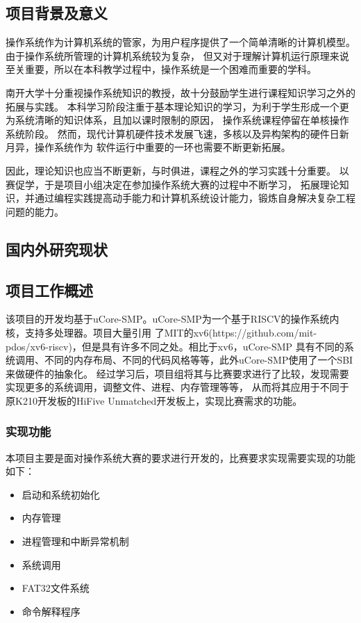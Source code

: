 \documentclass[UTF8,a4paper,10pt]{ctexart}
\begin{document}
\subsection{项目背景及意义}

操作系统作为计算机系统的管家，为用户程序提供了一个简单清晰的计算机模型。由于操作系统所管理的计算机系统较为复杂，
但又对于理解计算机运行原理来说至关重要，所以在本科教学过程中，操作系统是一个困难而重要的学科。

南开大学十分重视操作系统知识的教授，故十分鼓励学生进行课程知识学习之外的拓展与实践。
本科学习阶段注重于基本理论知识的学习，为利于学生形成一个更为系统清晰的知识体系，且加以课时限制的原因，
操作系统课程停留在单核操作系统阶段。
然而，现代计算机硬件技术发展飞速，多核以及异构架构的硬件日新月异，操作系统作为
软件运行中重要的一环也需要不断更新拓展。

因此，理论知识也应当不断更新，与时俱进，课程之外的学习实践十分重要。
以赛促学，于是项目小组决定在参加操作系统大赛的过程中不断学习，
拓展理论知识，并通过编程实践提高动手能力和计算机系统设计能力，锻炼自身解决复杂工程问题的能力。


\subsection{国内外研究现状}

\subsection{项目工作概述}

该项目的开发均基于uCore-SMP。uCore-SMP为一个基于RISCV的操作系统内核，支持多处理器。项目大量引用
了MIT的xv6(https://github.com/mit-pdos/xv6-riscv)，但是具有许多不同之处。相比于xv6，uCore-SMP
具有不同的系统调用、不同的内存布局、不同的代码风格等等，此外uCore-SMP使用了一个SBI来做硬件的抽象化。
经过学习后，项目组将其与比赛要求进行了比较，发现需要实现更多的系统调用，调整文件、进程、内存管理等等，
从而将其应用于不同于原K210开发板的HiFive Unmatched开发板上，实现比赛需求的功能。

\subsubsection{实现功能}

本项目主要是面对操作系统大赛的要求进行开发的，比赛要求实现需要实现的功能如下：

\begin{itemize}
  \item 启动和系统初始化
  \item 内存管理
  \item 进程管理和中断异常机制
  \item 系统调用
  \item FAT32文件系统
  \item 命令解释程序
\end{itemize}
\end{document}

